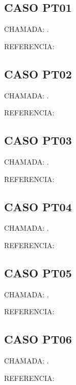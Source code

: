 \documentclass{undftex}
\begin{document}
\begin{refsection}\section*{CASO PT01} CHAMADA: . \textcite{v23}\par REFERENCIA:\par\printbibliography[heading=none,check=undfconsultadas]\end{refsection}\clearpage
\begin{refsection}\section*{CASO PT02} CHAMADA: . \textcite{pt02}\par REFERENCIA:\par\printbibliography[heading=none,check=undfconsultadas]\end{refsection}\clearpage
\begin{refsection}\section*{CASO PT03} CHAMADA: . \textcite{pt03}\par REFERENCIA:\par\printbibliography[heading=none,check=undfconsultadas]\end{refsection}\clearpage
\begin{refsection}\section*{CASO PT04} CHAMADA: . \textcite{pt04}\par REFERENCIA:\par\printbibliography[heading=none,check=undfconsultadas]\end{refsection}\clearpage
\begin{refsection}\section*{CASO PT05} CHAMADA: . \textcite{pt05}\par REFERENCIA:\par\printbibliography[heading=none,check=undfconsultadas]\end{refsection}\clearpage
\begin{refsection}\section*{CASO PT06} CHAMADA: . \textcite{pt06}\par REFERENCIA:\par\printbibliography[heading=none,check=undfconsultadas]\end{refsection}\clearpage
\end{document}
